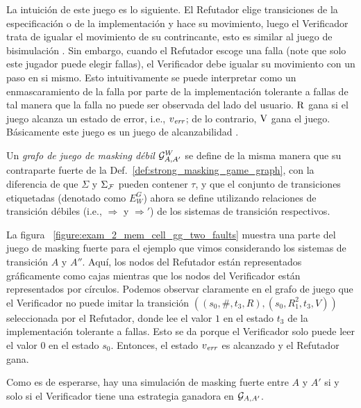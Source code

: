 La intuición de este juego es lo siguiente. 
El Refutador elige transiciones de la especificación o de la implementación y hace su movimiento, luego el Verificador trata de igualar el movimiento de su contrincante, esto es similar al juego de bisimulación \cite{Stirling99}. 
Sin embargo, cuando el Refutador escoge una falla (note que solo este jugador puede elegir fallas), el Verificador debe igualar su movimiento con un paso en si mismo.
Esto intuitivamente se puede interpretar como un enmascaramiento de la falla por parte de la implementación tolerante a fallas de tal manera que la falla no puede ser observada del lado del usuario. $\mathrm{R}$ gana si el juego alcanza un estado de error, i.e., $v_{\mathit{err}}$; de lo contrario, $\mathrm{V}$ gana el juego. 
Básicamente este juego es un juego de alcanzabilidad \cite{Jurd11}.

Un \emph{grafo de juego de masking débil} $\mathcal{G}^W_{A,A'}$ se define de la misma manera que su contraparte fuerte de la 
Def.~\ref{def:strong_masking_game_graph}, con la diferencia de que
$\Sigma$ y $\Sigma_{\mathcal{F}}$ pueden contener $\tau$, y que el conjunto de transiciones etiquetadas (denotado como $E_W^G$) ahora se define utilizando relaciones de transición débiles (i.e., $\Rightarrow$ y $\Rightarrow'$) de los sistemas de transición respectivos.

La figura ~\ref{figure:exam_2_mem_cell_gg_two_faults} muestra una parte del juego de masking fuerte para el ejemplo que vimos considerando los sistemas de transición $A$ y $A''$. Aquí, los nodos del Refutador están representados gráficamente como cajas mientras que los nodos del Verificador están representados por círculos.
Podemos observar claramente en el grafo de juego que el Verificador no puede imitar la transición $((s_0, \#, t_3, R),(s_0, R_1^2, t_3, V))$
seleccionada por el Refutador, donde lee el valor $1$ en el estado $t_3$ de la implementación tolerante a fallas. Esto se da porque el Verificador solo puede leer el valor $0$ en el estado $s_0$. 
Entonces, el estado $v_{\mathit{err}}$ es alcanzado y el Refutador gana.

Como es de esperarse, hay una simulación de masking fuerte entre $A$ y $A'$
si y solo si el Verificador tiene una estrategia ganadora en $\mathcal{G}_{A, A'}$.

